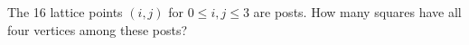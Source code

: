 The 16 lattice points $(i,j)$ for $0\le i,j\le3$ are posts. How many squares have all four vertices among these posts?
